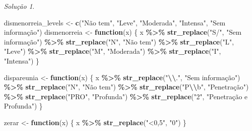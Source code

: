 \documentclass[
]{latex/krantz}
\newenvironment{Shaded}{\begin{snugshade}}{\end{snugshade}}
\newcommand{\ControlFlowTok}[1]{\textcolor[rgb]{0.13,0.29,0.53}{\textbf{#1}}}
\newcommand{\FunctionTok}[1]{\textcolor[rgb]{0.13,0.29,0.53}{\textbf{#1}}}
\newcommand{\NormalTok}[1]{#1}
\newcommand{\OtherTok}[1]{\textcolor[rgb]{0.56,0.35,0.01}{#1}}
\newcommand{\SpecialCharTok}[1]{\textcolor[rgb]{0.81,0.36,0.00}{\textbf{#1}}}
\newcommand{\StringTok}[1]{\textcolor[rgb]{0.31,0.60,0.02}{#1}}
\theoremstyle{definition}
\theoremstyle{definition}
\theoremstyle{definition}
\theoremstyle{definition}
\theoremstyle{remark}
\newtheorem*{solution}{Solução}
\begin{document}
\begin{solution}
\begin{Shaded}
\begin{Highlighting}[]
\NormalTok{dismenorreia\_levels }\OtherTok{\textless{}{-}} \FunctionTok{c}\NormalTok{(}\StringTok{"Não tem"}\NormalTok{, }\StringTok{"Leve"}\NormalTok{, }\StringTok{"Moderada"}\NormalTok{, }\StringTok{"Intensa"}\NormalTok{, }\StringTok{"Sem informação"}\NormalTok{)}
\NormalTok{dismenorreia }\OtherTok{\textless{}{-}} \ControlFlowTok{function}\NormalTok{(x) \{}
\NormalTok{  x }\SpecialCharTok{\%\textgreater{}\%} 
    \FunctionTok{str\_replace}\NormalTok{(}\StringTok{"S/"}\NormalTok{, }\StringTok{"Sem informação"}\NormalTok{) }\SpecialCharTok{\%\textgreater{}\%}
    \FunctionTok{str\_replace}\NormalTok{(}\StringTok{"N"}\NormalTok{, }\StringTok{"Não tem"}\NormalTok{) }\SpecialCharTok{\%\textgreater{}\%}
    \FunctionTok{str\_replace}\NormalTok{(}\StringTok{"L"}\NormalTok{, }\StringTok{"Leve"}\NormalTok{) }\SpecialCharTok{\%\textgreater{}\%}
    \FunctionTok{str\_replace}\NormalTok{(}\StringTok{"M"}\NormalTok{, }\StringTok{"Moderada"}\NormalTok{) }\SpecialCharTok{\%\textgreater{}\%} 
    \FunctionTok{str\_replace}\NormalTok{(}\StringTok{"I"}\NormalTok{, }\StringTok{"Intensa"}\NormalTok{)}
\NormalTok{\}}

\NormalTok{dispareunia }\OtherTok{\textless{}{-}} \ControlFlowTok{function}\NormalTok{(x) \{}
\NormalTok{  x }\SpecialCharTok{\%\textgreater{}\%}
    \FunctionTok{str\_replace}\NormalTok{(}\StringTok{"}\SpecialCharTok{\textbackslash{}\textbackslash{}}\StringTok{."}\NormalTok{, }\StringTok{"Sem informação"}\NormalTok{) }\SpecialCharTok{\%\textgreater{}\%}
    \FunctionTok{str\_replace}\NormalTok{(}\StringTok{"N"}\NormalTok{, }\StringTok{"Não tem"}\NormalTok{) }\SpecialCharTok{\%\textgreater{}\%}
    \FunctionTok{str\_replace}\NormalTok{(}\StringTok{"P}\SpecialCharTok{\textbackslash{}\textbackslash{}}\StringTok{b"}\NormalTok{, }\StringTok{"Penetração"}\NormalTok{) }\SpecialCharTok{\%\textgreater{}\%}
    \FunctionTok{str\_replace}\NormalTok{(}\StringTok{"PRO"}\NormalTok{, }\StringTok{"Profunda"}\NormalTok{) }\SpecialCharTok{\%\textgreater{}\%}
    \FunctionTok{str\_replace}\NormalTok{(}\StringTok{"2"}\NormalTok{, }\StringTok{"Penetração e Profunda"}\NormalTok{)}
\NormalTok{\}}

\NormalTok{zerar }\OtherTok{\textless{}{-}} \ControlFlowTok{function}\NormalTok{(x) \{}
\NormalTok{  x }\SpecialCharTok{\%\textgreater{}\%}
    \FunctionTok{str\_replace}\NormalTok{(}\StringTok{"\textless{}0,5"}\NormalTok{, }\StringTok{"0"}\NormalTok{)}
\NormalTok{\}}


\end{Highlighting}
\end{Shaded}
\end{solution}
\end{document}
